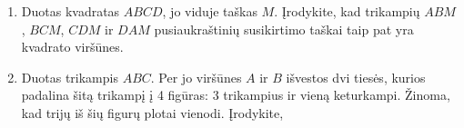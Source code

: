 \begin{enumerate}
\item Duotas kvadratas $ABCD$, jo viduje taškas $M$.  Įrodykite, kad
  trikampių $ABM$, $BCM$, $CDM$ ir $DAM$ pusiaukraštinių susikirtimo taškai
  taip pat yra kvadrato viršūnes.
\item Duotas trikampis $ABC$. Per jo viršūnes $A$ ir $B$ išvestos dvi
  tiesės, kurios padalina šitą trikampį į 4 figūras: 3 trikampius ir vieną
  keturkampi. Žinoma, kad trijų iš šių figurų plotai vienodi. Įrodykite,

\end{enumerate}
